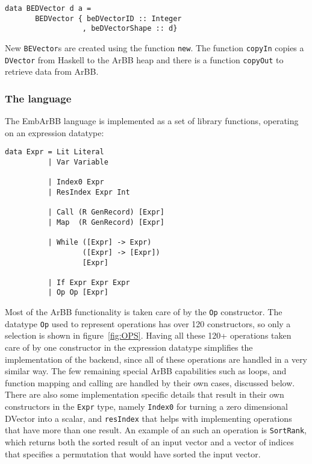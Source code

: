 \begin{verbatim}
data BEDVector d a = 
       BEDVector { beDVectorID :: Integer
                  , beDVectorShape :: d}  
\end{verbatim}

New {\tt BEVector}s are created using the function {\tt new}.
The function {\tt copyIn} copies a {\tt DVector} from Haskell to the ArBB heap 
and there is a function {\tt copyOut} to retrieve data from ArBB.  


\subsubsection{The language} 
The EmbArBB language is implemented as a set of library functions, operating on an expression datatype:

\begin{verbatim} 
data Expr = Lit Literal
          | Var Variable 
            
          | Index0 Expr 
          | ResIndex Expr Int 
            
          | Call (R GenRecord) [Expr]  
          | Map  (R GenRecord) [Expr]   
            
          | While ([Expr] -> Expr)  
                  ([Expr] -> [Expr])  
                  [Expr] 
                             
          | If Expr Expr Expr 
          | Op Op [Expr]   
\end{verbatim} 
Most of the ArBB functionality is taken care of by the {\tt Op} constructor. 
The datatype {\tt Op} used to represent operations has over 120 
constructors, so only a selection is shown in figure~\ref{fig:OPS}. 
Having all these 120+ operations taken care of by one constructor in 
the expression datatype simplifies the implementation of the backend, 
since all of these operations are handled in a very similar way. The few 
remaining special ArBB capabilities such as loops, and function mapping 
and calling are handled by their own cases, discussed below. There are 
also some implementation specific details that result in their own 
constructors in the {\tt Expr} type, namely {\tt Index0} for turning a 
zero dimensional DVector into a scalar, and {\tt resIndex} that helps with 
implementing operations that have more than one result. An example of an 
such an operation is {\tt SortRank}, which returns both the sorted result 
of an input vector and a vector of indices that specifies a permutation 
that would have sorted the input vector. 

